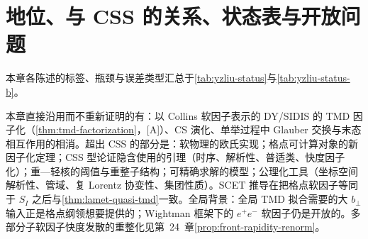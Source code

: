 \section{地位、与 CSS 的关系、状态表与开放问题}\label{sec:yzliu-status}

本章各陈述的标签、瓶颈与误差类型汇总于\cref{tab:yzliu-status}与\cref{tab:yzliu-status-b}。

\begin{remark}\label{rem:yzliu-relation-css}
本章直接沿用而不重新证明的有：以 Collins 软因子表示的 DY/SIDIS 的 TMD 因子化（\cref{thm:tmd-factorization}，[A]）、CS 演化、单举过程中 Glauber 交换与末态相互作用的相消。超出 CSS 的部分是：软物理的欧氏实现；格点可计算对象的新因子化定理；CSS 型论证隐含使用的引理（时序、解析性、普适类、快度因子化）；重—轻核的阈值与重整子结构；可精确求解的模型；公理化工具（坐标空间解析性、管域、复 Lorentz 协变性、集团性质）。SCET 推导\cite{Vladimirov:2020ofp,Ebert:2022fmh,delRio:2023pse}在把格点软因子等同于 $S_I$ 之后与\cref{thm:lamet-quasi-tmd}一致。全局背景：全局 TMD 拟合\cite{Scimemi:2019cmh}需要的大 $b_\perp$ 输入正是格点纲领想要提供的；Wightman 框架下的 $e^+e^-$ 软因子\cite{Collins:2023cuo}仍是开放的。多部分子软因子快度发散的重整化见第~24~章\cref{prop:front-rapidity-renorm}。
\end{remark}



